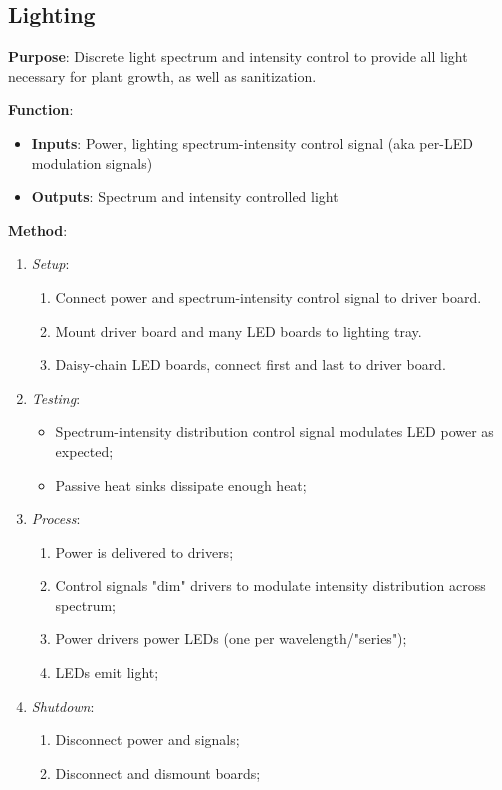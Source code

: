 \subsection{Lighting}
\label{sec:lighting}

\textbf{Purpose}: Discrete light spectrum and intensity control to provide all light necessary for plant growth, as well as sanitization.

\textbf{Function}:
\begin{itemize}
    \item \textbf{Inputs}: Power, lighting spectrum-intensity control signal (aka per-LED modulation signals)
    \item \textbf{Outputs}: Spectrum and intensity controlled light
\end{itemize}

\textbf{Method}:
\begin{enumerate}
    \item \textit{Setup}:
    \begin{enumerate}
        \item Connect power and spectrum-intensity control signal to driver board.
        \item Mount driver board and many LED boards to lighting tray.
        \item Daisy-chain LED boards, connect first and last to driver board.
    \end{enumerate}
    \item \textit{Testing}:
    \begin{itemize}
        \item Spectrum-intensity distribution control signal modulates LED power as expected;
        \item Passive heat sinks dissipate enough heat;
    \end{itemize}
    \item \textit{Process}:
    \begin{enumerate}
        \item Power is delivered to drivers;
        \item Control signals "dim" drivers to modulate intensity distribution across spectrum;
        \item Power drivers power LEDs (one per wavelength/"series");
        \item LEDs emit light;
    \end{enumerate}
    \item \textit{Shutdown}:
    \begin{enumerate}
        \item Disconnect power and signals;
        \item Disconnect and dismount boards;
    \end{enumerate}
\end{enumerate}


